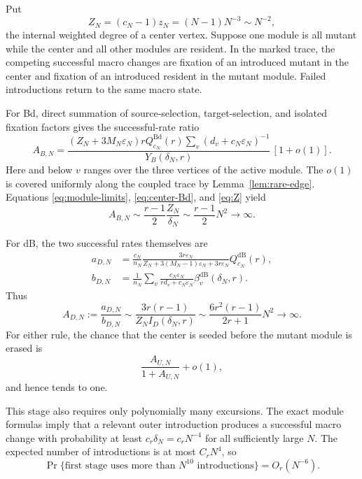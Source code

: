 \documentclass[11pt]{article}
\theoremstyle{definition}
\theoremstyle{remark}
\newcommand{\Bd}{\mathrm{Bd}}
\newcommand{\dB}{\mathrm{dB}}
\newcommand{\eps}{\varepsilon}
\begin{document}
Put
\begin{equation}
 Z_N=(c_N-1)z_N=(N-1)N^{-3}\sim N^{-2},
 \label{eq:Z}
\end{equation}
the internal weighted degree of a center vertex.  Suppose one module is all
mutant while the center and all other modules are resident.  In the marked
trace, the competing successful macro changes are fixation of an introduced
mutant in the center and fixation of an introduced resident in the mutant
module.  Failed introductions return to the same macro state.

For Bd, direct summation of source-selection, target-selection, and isolated
fixation factors gives the successful-rate ratio
\begin{equation}
 A_{B,N}
 =\frac{(Z_N+3M_N\eps_N)rQ^{\Bd}_{c_N}(r)
 \sum_v(d_v+c_N\eps_N)^{-1}}
 {Y_B(\delta_N,r)}\,[1+o(1)].
 \label{eq:A-Bd}
\end{equation}
Here and below $v$ ranges over the three vertices of the active module.  The
$o(1)$ is covered uniformly along the coupled trace by
Lemma~\ref{lem:rare-edge}.  Equations
\eqref{eq:module-limits}, \eqref{eq:center-Bd}, and \eqref{eq:Z} yield
\begin{equation}
 A_{B,N}\sim\frac{r-1}{2}\frac{Z_N}{\delta_N}
 \sim\frac{r-1}{2}N^2\longrightarrow\infty.
 \label{eq:A-Bd-asymptotic}
\end{equation}

For dB, the two successful rates themselves are
\begin{align}
 a_{D,N}&=\frac{c_N}{n_N}
 \frac{3r\eps_N}
 {Z_N+3(M_N-1)\eps_N+3r\eps_N}
 Q^{\dB}_{c_N}(r),\label{eq:a-D}\\
 b_{D,N}&=\frac1{n_N}\sum_v
 \frac{c_N\eps_N}{rd_v+c_N\eps_N}
 \beta_v^{\dB}(\delta_N,r).
 \label{eq:b-D}
\end{align}
Thus
\begin{equation}
 A_{D,N}:=\frac{a_{D,N}}{b_{D,N}}
 \sim\frac{3r(r-1)}{Z_NI_D(\delta_N,r)}
 \sim\frac{6r^2(r-1)}{2r+1}N^2\longrightarrow\infty.
 \label{eq:A-dB}
\end{equation}
For either rule, the chance that the center is seeded before the mutant
module is erased is
\begin{equation}
 \frac{A_{U,N}}{1+A_{U,N}}+o(1),
 \label{eq:first-stage-prob}
\end{equation}
and hence tends to one.

This stage also requires only polynomially many excursions.  The exact module
formulas imply that a relevant outer introduction produces a successful macro
change with probability at least $c_r\delta_N=c_rN^{-4}$ for all sufficiently
large $N$.  The expected number of introductions is at most $C_rN^4$, so
\begin{equation}
 \Pr\{\text{first stage uses more than }N^{10}\text{ introductions}\}
 =O_r(N^{-6}).
 \label{eq:first-tail}
\end{equation}
\end{document}
